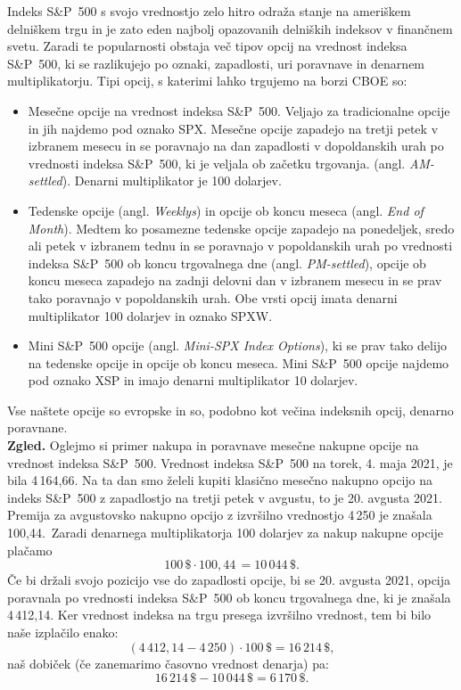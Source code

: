\documentclass[12pt,a4paper, reqno]{amsart}
\theoremstyle{definition} %
\theoremstyle{plain} %
\begin{document}
Indeks S\&P~500 s svojo vrednostjo zelo hitro odraža stanje na ameriškem delniškem trgu in je zato eden najbolj opazovanih delniških indeksov v finančnem svetu. Zaradi te popularnosti obstaja več tipov opcij na vrednost indeksa S\&P~500, ki se razlikujejo po oznaki, zapadlosti, uri poravnave in denarnem multiplikatorju. Tipi opcij, s katerimi lahko trgujemo na borzi CBOE so:
\begin{itemize}
\item Mesečne opcije na vrednost indeksa S\&P~500. Veljajo za tradicionalne opcije in jih najdemo pod oznako SPX. Mesečne opcije zapadejo na tretji petek v izbranem mesecu in se poravnajo na dan zapadlosti v dopoldanskih urah po vrednosti indeksa S\&P~500, ki je veljala ob začetku trgovanja. (angl. \textit{AM-settled}). Denarni multiplikator je 100 dolarjev.\\

\item Tedenske opcije (angl. \textit{Weeklys}) in opcije ob koncu meseca (angl. \textit{End of Month}). Medtem ko posamezne tedenske opcije zapadejo na ponedeljek, sredo ali petek v izbranem tednu in se poravnajo v popoldanskih urah po vrednosti indeksa S\&P~500 ob koncu trgovalnega dne (angl. \textit{PM-settled}), opcije ob koncu meseca zapadejo na zadnji delovni dan v izbranem mesecu in se prav tako poravnajo v popoldanskih urah. Obe vrsti opcij imata denarni multiplikator 100 dolarjev in oznako SPXW.\\

\item Mini S\&P~500 opcije (angl. \textit{Mini-SPX Index Options}), ki se prav tako delijo na tedenske opcije in opcije ob koncu meseca. Mini S\&P~500 opcije najdemo pod oznako XSP in imajo denarni multiplikator 10 dolarjev.\\
\end{itemize}

Vse naštete opcije so evropske in so, podobno kot večina indeksnih opcij, denarno poravnane.\\

\textbf{Zgled.} 
Oglejmo si primer nakupa in  poravnave mesečne nakupne opcije na vrednost indeksa S\&P~500.  Vrednost indeksa S\&P~500 na torek, 4. maja 2021, je bila 4\,164,66. Na ta dan smo želeli kupiti klasično mesečno nakupno opcijo na indeks S\&P~500 z zapadlostjo na tretji petek v avgustu, to je 20. avgusta 2021. Premija za avgustovsko nakupno opcijo z izvršilno vrednostjo 4\,250 je znašala  100,44.\
Zaradi denarnega multiplikatorja 100 dolarjev za nakup nakupne opcije plačamo
$$
100\, \$ \cdot 100,\!44 \, = 10\,044 \,\$.
$$
Če bi držali svojo pozicijo vse do zapadlosti opcije, bi se 20. avgusta 2021, opcija poravnala po vrednosti indeksa S\&P~500 ob koncu trgovalnega dne, ki je znašala 4\,412,14. Ker vrednost indeksa na trgu presega izvršilno vrednost, tem bi bilo naše izplačilo enako:
$$
(4\,412,\!14 - 4\,250) \cdot 100\,\$ = 16\,214\,\$,
$$
naš dobiček (če zanemarimo časovno vrednost denarja) pa:
$$
16\,214 \, \$ -10\,044 \, \$ = 6\,170\,\$.
$$
\end{document}
